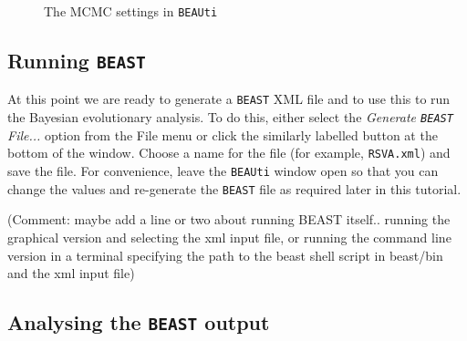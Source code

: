 \documentclass[cup7b, english]{cupbook}
\begin{document}
\begin{figure}[htbp]
\begin{center}
\leavevmode
{}
\end{center}
\caption{The MCMC settings in \texttt{BEAUti}}
\label{fig:figure4}
\end{figure}

\subsection{Running \texttt{BEAST}}

At this point we are ready to generate a \texttt{BEAST} XML file and to use this to run the Bayesian
evolutionary analysis. To do this, either select the {\it Generate \texttt{BEAST} File...} option
from the File menu or click the similarly labelled button at the bottom of the window.
Choose a name for the file (for example, \texttt{RSVA.xml}) and save the file. For
convenience, leave the \texttt{BEAUti} window open so that you can change the values and re-generate
the \texttt{BEAST} file as required later in this tutorial.

(Comment: maybe add a line or two about running BEAST itself..  running the graphical version and selecting the xml input file, or   running the command line version in a terminal specifying the path to the beast shell script in beast/bin and the xml input file)

\subsection{Analysing the \texttt{BEAST} output}
\end{document}
